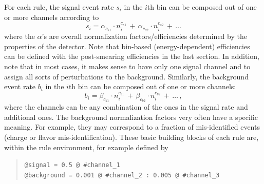For each rule, the signal event rate $s_i$ in the $i$th bin can be composed 
out of one or more channels according to 
\begin{equation}
s_i=\alpha_{c_{s1}}\cdot n_i^{c_{s1}}\,+\,\alpha_{c_{s2}}\cdot n_i^{c_{s2}}\,+\,\ldots
\end{equation}
where the $\alpha$'s are overall normalization factors/efficiencies
 determined by the properties of the detector. Note that bin-based (energy-dependent) efficiencies can be defined with the post-smearing efficiencies in the last section. 
In addition, note that in most cases, it makes sense to have only one 
signal channel and to assign all sorts of perturbations to the background. 
%
Similarly, the background event rate $b_i$ in the $i$th bin can be composed
out of one or more channels:
\begin{equation}
b_i=\beta_{c_{b1}}\cdot n_i^{c_{b1}}\,+\,\beta_{c_{b2}}\cdot n_i^{c_{b2}}\,+\,\ldots \, ,
\end{equation}
where the channels can be any combination of the ones in the signal rate and 
additional ones. The background normalization factors very often have
a specific meaning. For example, they may correspond to a fraction
of mis-identified events (charge or flavor mis-identification).
%
%
These basic building blocks of each rule are, within the rule environment,
for example defined by
\begin{quote}
{\tt \tb @signal = 0.5 @ \#channel\_1\\
\tb @background = 0.001 @ \#channel\_2 :  0.005 @ \#channel\_3
}
\end{quote}

